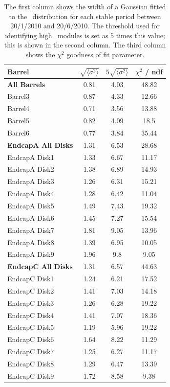 \begin{table}[h]
 \centering
\begin{tabular}{ l  c  c  c }
\hline\hline
Barrel & $\sqrt{\langle \sigma ^ 2 \rangle }$ & $5\sqrt{\langle \sigma ^ 2 \rangle }$ & $\chi ^2$  / ndf\\
\hline
\textbf{All Barrels} & 0.81 & 4.03 & 48.82 \\
Barrel3 & 0.87 & 4.33 & 12.66 \\
Barrel4 & 0.71 & 3.56 & 13.88 \\
Barrel5 & 0.82 & 4.09 & 18.5 \\
Barrel6 & 0.77 & 3.84 & 35.44 \\
\hline
\textbf{EndcapA All Disks} & 1.31 & 6.53 & 28.68 \\
EndcapA Disk1 & 1.33 & 6.67 & 11.17 \\
EndcapA Disk2 & 1.38 & 6.89 & 14.93 \\
EndcapA Disk3 & 1.26 & 6.31 & 15.21 \\
EndcapA Disk4 & 1.28 & 6.42 & 11.04 \\
EndcapA Disk5 & 1.49 & 7.43 & 19.32 \\
EndcapA Disk6 & 1.45 & 7.27 & 15.54 \\
EndcapA Disk7 & 1.81 & 9.05 & 13.96 \\
EndcapA Disk8 & 1.39 & 6.95 & 10.05 \\
EndcapA Disk9 & 1.96 & 9.8 & 9.05 \\
\hline
\textbf{EndcapC All Disks} & 1.31 & 6.57 & 44.63 \\
EndcapC Disk1 & 1.24 & 6.21 & 17.52 \\
EndcapC Disk2 & 1.41 & 7.03 & 14.18 \\
EndcapC Disk3 & 1.26 & 6.28 & 19.22 \\
EndcapC Disk4 & 1.41 & 7.07 & 18.36 \\
EndcapC Disk5 & 1.19 & 5.96 & 19.22 \\
EndcapC Disk6 & 1.64 & 8.22 & 11.29 \\
EndcapC Disk7 & 1.25 & 6.27 & 11.17 \\
EndcapC Disk8 & 1.29 & 6.47 & 13.39 \\
EndcapC Disk9 & 1.72 & 8.58 & 9.38 \\
\hline\hline
\end{tabular}
\caption[The width of a Gaussian fit to the \tdiff\ distribution for each
stable period between 20/1/2010 and 20/6/2010.]
{The first column shows the width of a Gaussian fitted to the \tdiff\ distribution for each
stable period between 20/1/2010 and 20/6/2010. The threshold used for
identifying high \tdiff\ modules is set as 5 times this value; this is shown
in the second column. The third column shows the $\chi^2$ goodness of fit
parameter.}
\label{table:tdiff_thresh}
\end{table}


